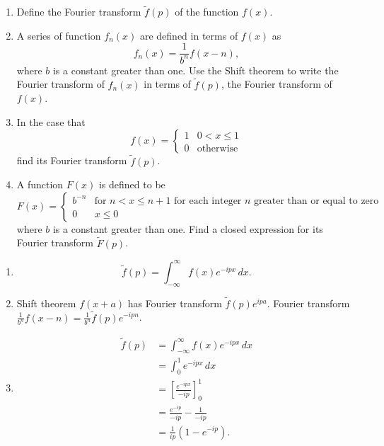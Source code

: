 \documentclass[10pt, a4paper]{article}
\begin{document}
\begin{problem}[$2024$]
    \begin{enumerate}[label = (\alph*)]
        \item Define the Fourier transform $\tilde{f}(p)$ of the function $f(x)$.

        \item A series of function $f_n(x)$ are defined in terms of $f(x)$ as
        \[
        f_n(x) = \frac{1}{b ^ n}f(x - n),
        \]
        where $b$ is a constant greater than one.
        Use the Shift theorem to write the Fourier transform of $f_n(x)$ in terms of $\tilde{f}(p)$,
        the Fourier transform of $f(x)$.

        \item In the case that
        \[
        f(x) = \begin{cases}
            1 & 0 < x \leq 1 \\
            0 & \text{otherwise}
        \end{cases}
        \]
        find its Fourier transform $\tilde{f}(p)$.

        \item A function $F(x)$ is defined to be
        \[
        F(x) = \begin{cases}
            b ^ {-n} & \text{for $n < x \leq n + 1$ for each integer $n$ greater than or equal to zero} \\
            0 & x \leq 0
        \end{cases}
        \]
        where $b$ is a constant greater than one.
        Find a closed expression for its Fourier transform $\tilde{F}(p)$.
    \end{enumerate}

    \begin{solution}
        \begin{enumerate}[label = (\alph*)]
            \item
            \[
            \tilde{f}(p) = \int_{-\infty}^{\infty}f(x)e ^ {-ipx}\,dx.
            \]

            \item
            Shift theorem $f(x + a)$ has Fourier transform $\tilde{f}(p)e ^ {ipa}$.
            Fourier transform $\frac{1}{b ^ n}f(x - n) = \frac{1}{b ^ n}\tilde{f}(p)e ^ {-ipn}$.

            \item
            \begin{align*}
                \tilde{f}(p) &= \int_{-\infty}^{\infty}f(x)e ^ {-ipx}\,dx \\
                &= \int_{0}^{1}e ^ {-ipx}\,dx \\
                &= \left[\frac{e ^ {-ipx}}{-ip}\right]_{0}^{1} \\
                &= \frac{e ^ {-ip}}{-ip} - \frac{1}{-ip} \\
                &= \frac{1}{ip}(1 - e ^ {-ip}).
            \end{align*}


\end{enumerate}
\end{solution}
\end{problem}
\end{document}
